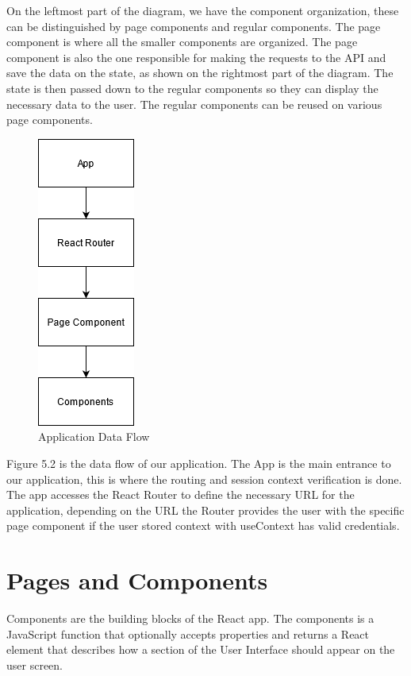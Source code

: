 \documentclass[a4paper,twoside,10pt]{report}
\begin{document}
On the leftmost part of the diagram, we have the component organization, these can be distinguished by page components and regular components.
The page component is where all the smaller components are organized. 
\newline
The page component is also the one responsible for making the requests to the API and save the data on the state, as shown on the rightmost part of the diagram.
\newline
The state is then passed down to the regular components so they can display the necessary data to the user.
The regular components can be reused on various page components.

\newpage
\begin{figure}[h!]
\center
  \includegraphics{client app interations.png}
\caption{Application Data Flow}
\end{figure}
Figure 5.2 is the data flow of our application.
The App is the main entrance to our application, this is where the routing and session context verification is done.
The app accesses the React Router to define the necessary URL for the application, depending on the URL the Router provides the user with the specific page component if the user stored context with useContext has valid credentials.

\section{Pages and Components}
Components are the building blocks of the React app. The components is a JavaScript function that optionally accepts properties and returns a React element that describes how a section of the User Interface should appear on the user screen. 
\end{document}
